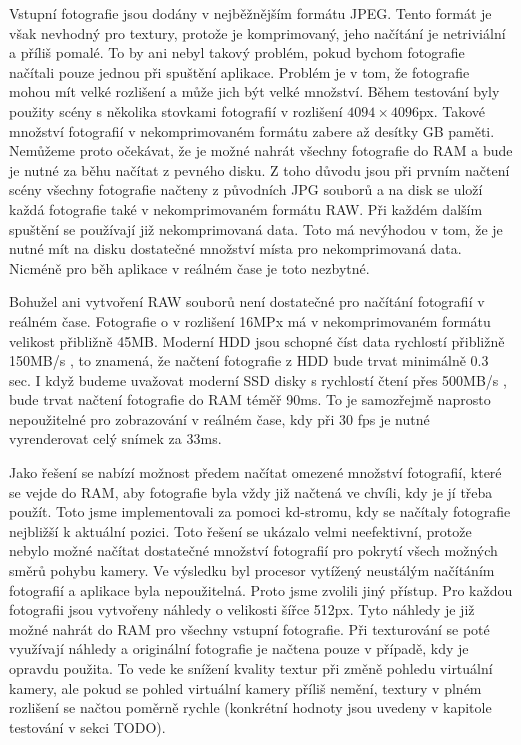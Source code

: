 \documentclass[11pt,twoside,a4paper]{book}
\begin{document}
Vstupní fotografie jsou dodány v nejběžnějším formátu JPEG. Tento formát je však nevhodný pro textury, protože je komprimovaný, jeho načítání je netriviální a příliš pomalé. To by ani nebyl takový problém, pokud bychom fotografie načítali pouze jednou při spuštění aplikace. Problém je v tom, že fotografie mohou mít velké rozlišení a může jich být velké množství. Během testování byly použity scény s několika stovkami fotografií v rozlišení $4094\times4096$px. Takové množství fotografií v nekomprimovaném formátu zabere až desítky GB paměti. Nemůžeme proto očekávat, že je možné nahrát všechny fotografie do RAM a bude je nutné za běhu načítat z pevného disku. Z toho důvodu jsou při prvním načtení scény všechny fotografie načteny z původních JPG souborů a na disk se uloží každá fotografie také v nekomprimovaném formátu RAW. Při každém dalším spuštění se používají již nekomprimovaná data. Toto má nevýhodou v tom, že je nutné mít na disku dostatečné množství místa pro nekomprimovaná data. Nicméně pro běh aplikace v reálném čase je toto nezbytné.

Bohužel ani vytvoření RAW souborů není dostatečné pro načítání fotografií v reálném čase. Fotografie o v rozlišení 16MPx má v nekomprimovaném formátu velikost přibližně 45MB. Moderní HDD jsou schopné číst data rychlostí přibližně 150MB/s \cite{hdd}, to znamená, že načtení fotografie z HDD bude trvat minimálně 0.3 sec. I když budeme uvažovat moderní SSD disky s rychlostí čtení přes 500MB/s \cite{ssd}, bude trvat načtení fotografie do RAM téměř 90ms. To je samozřejmě naprosto nepoužitelné pro zobrazování v reálném čase, kdy při 30 fps je nutné vyrenderovat celý snímek za 33ms.

Jako řešení se nabízí možnost předem načítat omezené množství fotografií, které se vejde do RAM, aby fotografie byla vždy již načtená ve chvíli, kdy je jí třeba použít. Toto jsme implementovali za pomoci kd-stromu, kdy se načítaly fotografie nejbližší k aktuální pozici. Toto řešení se ukázalo velmi neefektivní, protože nebylo možné načítat dostatečné množství fotografií pro pokrytí všech možných směrů pohybu kamery. Ve výsledku byl procesor vytížený neustálým načítáním fotografií a aplikace byla nepoužitelná. Proto jsme zvolili jiný přístup. Pro každou fotografii jsou vytvořeny náhledy o velikosti šířce 512px. Tyto náhledy je již možné nahrát do RAM pro všechny vstupní fotografie. Při texturování se poté využívají náhledy a originální fotografie je načtena pouze v případě, kdy je opravdu použita. To vede ke snížení kvality textur při změně pohledu virtuální kamery, ale pokud se pohled virtuální kamery příliš nemění, textury v plném rozlišení se načtou poměrně rychle (konkrétní hodnoty jsou uvedeny v kapitole testování v sekci TODO).
\end{document}
